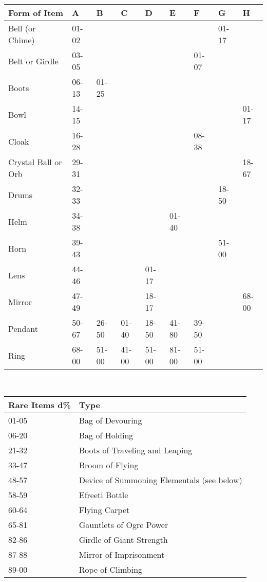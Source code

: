 \documentclass[a4paper,twoside,openany,10pt]{book}
\begin{document}
\begin{tabular*}{1\linewidth}{@{\extracolsep{\fill}}lllllllll}
\textbf{Form of Item} & A & B & C & D & E & F & G & H \\\toprule
Bell (or Chime) & 01-02 & & & & & & 01-17 & \\\hline
Belt or Girdle & 03-05 & & & & & 01-07 & & \\\hline
Boots & 06-13 & 01-25 & & & & & & \\\hline
Bowl & 14-15 & & & & & & & 01-17 \\\hline
Cloak & 16-28 & & & & & 08-38 & & \\\hline
Crystal Ball or Orb & 29-31 & & & & & & & 18-67 \\\hline
Drums & 32-33 & & & & & & 18-50 & \\\hline
Helm & 34-38 & & & & 01-40 & & & \\\hline
Horn & 39-43 & & & & & & 51-00 & \\\hline
Lens & 44-46 & & & 01-17 & & & & \\\hline
Mirror & 47-49 & & & 18-17 & & & & 68-00 \\\hline
Pendant & 50-67 & 26-50 & 01-40 & 18-50 & 41-80 & 39-50 & & \\\hline
Ring & 68-00 & 51-00 & 41-00 & 51-00 & 81-00 & 51-00 & & \\\bottomrule
\end{tabular*}\\\medskip


\label{rare-items}

\begin{tabular*}{1\linewidth}{@{\extracolsep{\fill}}ll}
\textbf{Rare Items} \textbf{d\%} & \textbf{Type} \\\toprule
01-05 & Bag of Devouring \\\hline
06-20 & Bag of Holding \\\hline
21-32 & Boots of Traveling and Leaping \\\hline
33-47 & Broom of Flying \\\hline
48-57 & Device of Summoning Elementals (see below) \\\hline
58-59 & Efreeti Bottle \\\hline
60-64 & Flying Carpet \\\hline
65-81 & Gauntlets of Ogre Power \\\hline
82-86 & Girdle of Giant Strength \\\hline
87-88 & Mirror of Imprisonment \\\hline
89-00 & Rope of Climbing \\\bottomrule
\end{tabular*}
\end{document}
